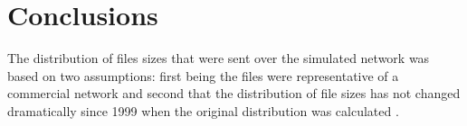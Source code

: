 \documentclass{sigcomm-alternate}
\begin{document}
\section{Conclusions}
\label{section:conclusions}


The distribution of files sizes that were sent over the simulated network was based on two assumptions: first being the files were representative of a commercial network and second that the distribution of file sizes has not changed dramatically since 1999 when the original distribution was calculated \cite{Douceur}. 





\balancecolumns
\end{document}
